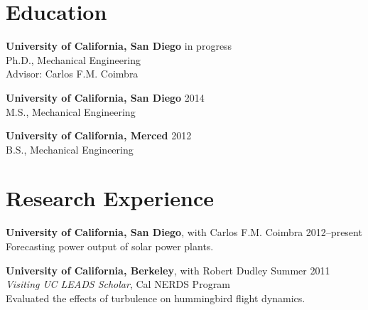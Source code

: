 \documentclass[]{res}
\begin{document}
\address{University of California, San Diego \\ 9500 Gilman Drive \#0411 \\ La Jolla, CA 92093--0411}
\address{\hfill \href{mailto:dplarson@ucsd.edu}{dplarson@ucsd.edu} \\
    \hfill \url{http://ieng6.ucsd.edu/~dplarson} \\
    \hfill \url{http://github.com/dplarson}
}


\begin{resume}


\section{Education}
\vspace{0.1in}

\textbf{University of California, San Diego} \hfill in progress \\
Ph.D., Mechanical Engineering \\
Advisor: Carlos F.M. Coimbra \\

\vspace{-0.2in}

\textbf{University of California, San Diego} \hfill 2014 \\
M.S., Mechanical Engineering \\

\vspace{-0.2in}

\textbf{University of California, Merced} \hfill 2012 \\
B.S., Mechanical Engineering


\section{Research Experience}
\vspace{0.1in}

\textbf{University of California, San Diego}, with Carlos F.M. Coimbra \hfill 2012--present\\
Forecasting power output of solar power plants.

\textbf{University of California, Berkeley}, with Robert Dudley \hfill Summer 2011 \\
\textit{Visiting UC LEADS Scholar}, Cal NERDS Program \\
Evaluated the effects of turbulence on hummingbird flight dynamics.


\end{resume}
\end{document}
